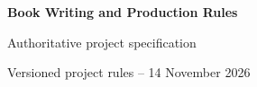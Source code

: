 


\thispagestyle{empty}
\begin{center}
{\sffamily\huge\bfseries\color{BookBlue} Book Writing and Production Rules\par}
\vspace{0.5cm}
{\large Authoritative project specification\par}
\vspace{0.6cm}
{\small Versioned project rules -- 14 November 2026\par}
\end{center}
\vspace{0.6cm}
\setcounter{secnumdepth}{0}


